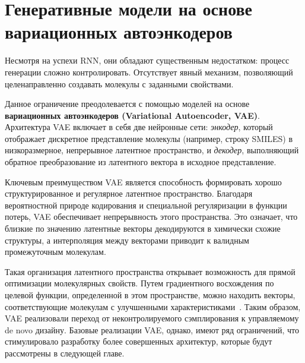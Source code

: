 

\section{Генеративные модели на основе вариационных автоэнкодеров}
\label{sec:vae}

Несмотря на успехи RNN, они обладают существенным недостатком: процесс генерации сложно контролировать. Отсутствует явный механизм, позволяющий целенаправленно создавать молекулы с заданными свойствами.

Данное ограничение преодолевается с помощью моделей на основе \textbf{вариационных автоэнкодеров (Variational Autoencoder, VAE)}. Архитектура VAE включает в себя две нейронные сети: \textit{энкодер}, который отображает дискретное представление молекулы (например, строку SMILES) в низкоразмерное, непрерывное латентное пространство, и \textit{декодер}, выполняющий обратное преобразование из латентного вектора в исходное представление.

Ключевым преимуществом VAE является способность формировать хорошо структурированное и регулярное латентное пространство. Благодаря вероятностной природе кодирования и специальной регуляризации в функции потерь, VAE обеспечивает непрерывность этого пространства. Это означает, что близкие по значению латентные векторы декодируются в химически схожие структуры, а интерполяция между векторами приводит к валидным промежуточным молекулам.

Такая организация латентного пространства открывает возможность для прямой оптимизации молекулярных свойств. Путем градиентного восхождения по целевой функции, определенной в этом пространстве, можно находить векторы, соответствующие молекулам с улучшенными характеристиками~\cite{wigh2022review}. Таким образом, VAE реализовали переход от неконтролируемого сэмплирования к управляемому de novo дизайну. Базовые реализации VAE, однако, имеют ряд ограничений, что стимулировало разработку более совершенных архитектур, которые будут рассмотрены в следующей главе.
